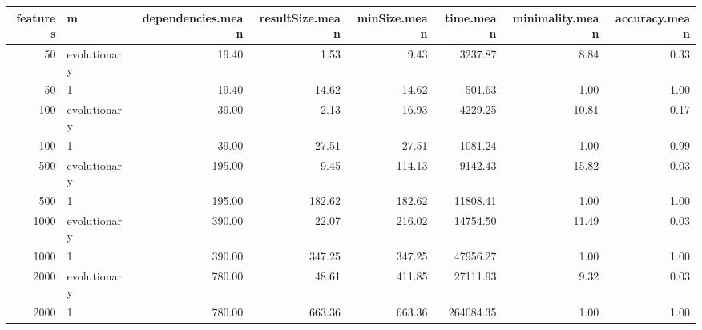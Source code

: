 \begin{table}[ht]
\centering
\begin{tabular}{rlrrrrrr}
  \hline
features & m & dependencies.mean & resultSize.mean & minSize.mean & time.mean & minimality.mean & accuracy.mean \\ 
  \hline
 50 & evolutionary & 19.40 & 1.53 & 9.43 & 3237.87 & 8.84 & 0.33 \\ 
   50 & 1 & 19.40 & 14.62 & 14.62 & 501.63 & 1.00 & 1.00 \\ 
  100 & evolutionary & 39.00 & 2.13 & 16.93 & 4229.25 & 10.81 & 0.17 \\ 
  100 & 1 & 39.00 & 27.51 & 27.51 & 1081.24 & 1.00 & 0.99 \\ 
  500 & evolutionary & 195.00 & 9.45 & 114.13 & 9142.43 & 15.82 & 0.03 \\ 
  500 & 1 & 195.00 & 182.62 & 182.62 & 11808.41 & 1.00 & 1.00 \\ 
  1000 & evolutionary & 390.00 & 22.07 & 216.02 & 14754.50 & 11.49 & 0.03 \\ 
  1000 & 1 & 390.00 & 347.25 & 347.25 & 47956.27 & 1.00 & 1.00 \\ 
  2000 & evolutionary & 780.00 & 48.61 & 411.85 & 27111.93 & 9.32 & 0.03 \\ 
  2000 & 1 & 780.00 & 663.36 & 663.36 & 264084.35 & 1.00 & 1.00 \\ 
   \hline
\end{tabular}
\end{table}

